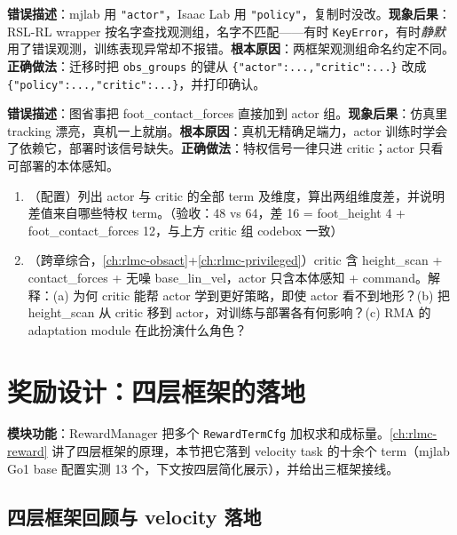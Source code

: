 \begin{pitfall}
\textbf{错误描述}：mjlab 用 \verb|"actor"|，Isaac Lab 用 \verb|"policy"|，复制时没改。\textbf{现象后果}：RSL-RL wrapper 按名字查找观测组，名字不匹配——有时 \verb|KeyError|，有时\emph{静默}用了错误观测，训练表现异常却不报错。\textbf{根本原因}：两框架观测组命名约定不同。\textbf{正确做法}：迁移时把 \verb|obs_groups| 的键从 \verb|{"actor":...,"critic":...}| 改成 \verb|{"policy":...,"critic":...}|，并打印确认。
\end{pitfall}

\begin{pitfall}
\textbf{错误描述}：图省事把 foot\_contact\_forces 直接加到 actor 组。\textbf{现象后果}：仿真里 tracking 漂亮，真机一上就崩。\textbf{根本原因}：真机无精确足端力，actor 训练时学会了依赖它，部署时该信号缺失。\textbf{正确做法}：特权信号一律只进 critic；actor 只看可部署的本体感知。
\end{pitfall}

\begin{practice}[观测设计]
\begin{enumerate}
\item （配置）列出 actor 与 critic 的全部 term 及维度，算出两组维度差，并说明差值来自哪些特权 term。（验收：48 vs 64，差 16 = foot\_height 4 + foot\_contact\_forces 12，与上方 critic 组 codebox 一致）
\item （跨章综合，\cref{ch:rlmc-obsact}+\cref{ch:rlmc-privileged}）critic 含 height\_scan + contact\_forces + 无噪 base\_lin\_vel，actor 只含本体感知 + command。解释：(a) 为何 critic 能帮 actor 学到更好策略，即使 actor 看不到地形？(b) 把 height\_scan 从 critic 移到 actor，对训练与部署各有何影响？(c) RMA 的 adaptation module 在此扮演什么角色？
\end{enumerate}
\end{practice}

\section{奖励设计：四层框架的落地}
\label{sec:rlmc-ql-reward}

\textbf{模块功能}：RewardManager 把多个 \verb|RewardTermCfg| 加权求和成标量。\cref{ch:rlmc-reward} 讲了四层框架的原理，本节把它落到 velocity task 的十余个 term（mjlab Go1 base 配置实测 13 个，下文按四层简化展示），并给出三框架接线。

\subsection{四层框架回顾与 velocity 落地}
\label{sec:rlmc-ql-reward-layers}

